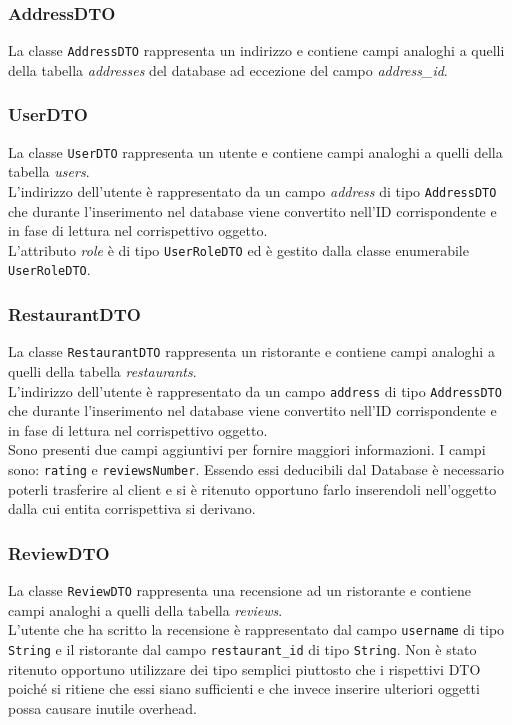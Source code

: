 \subsubsection{AddressDTO}
\label{sec:addressdto}
La classe \texttt{AddressDTO} rappresenta un indirizzo
e contiene campi analoghi a quelli della tabella
\textit{addresses} del database ad eccezione del campo
\textit{address\_id}.

\subsubsection{UserDTO}
\label{sec:userdto}
La classe \texttt{UserDTO} rappresenta un utente
e contiene campi analoghi a quelli della tabella
\textit{users}.\\
L'indirizzo dell'utente è rappresentato da un campo
\textit{address} di tipo \texttt{AddressDTO} che durante 
l'inserimento nel database viene convertito nell'ID corrispondente 
e in fase di lettura nel corrispettivo oggetto.\\
L'attributo \textit{role} è di tipo \texttt{UserRoleDTO} ed è 
gestito dalla classe enumerabile \texttt{UserRoleDTO}.

\subsubsection{RestaurantDTO}
\label{sec:restaurantdto}
La classe \texttt{RestaurantDTO} rappresenta un ristorante
e contiene campi analoghi a quelli della tabella
\textit{restaurants}.\\
L'indirizzo dell'utente è rappresentato da un campo
\texttt{address} di tipo \texttt{AddressDTO} che durante 
l'inserimento nel database viene convertito nell'ID corrispondente 
e in fase di lettura nel corrispettivo oggetto.\\
Sono presenti due campi aggiuntivi per fornire maggiori 
informazioni. I campi sono: \texttt{rating} e 
\texttt{reviewsNumber}. Essendo essi deducibili dal Database è 
necessario poterli trasferire al client e si è ritenuto opportuno 
farlo inserendoli nell'oggetto dalla cui entita corrispettiva si 
derivano.\\

\subsubsection{ReviewDTO}
\label{sec:reviewdto}
La classe \texttt{ReviewDTO} rappresenta una recensione ad un 
ristorante e contiene campi analoghi a quelli della tabella
\textit{reviews}.\\
L'utente che ha scritto la recensione è rappresentato dal campo 
\texttt{username} di tipo \texttt{String} e il ristorante dal campo 
\texttt{restaurant\_id} di tipo \texttt{String}.
Non è stato ritenuto opportuno utilizzare dei tipo semplici piuttosto
che i rispettivi DTO poiché si ritiene che essi siano sufficienti e 
che invece inserire ulteriori oggetti possa causare inutile overhead.\\

